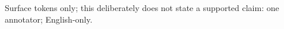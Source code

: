 Surface tokens only; this deliberately does not state a supported claim: one annotator; English-only.
